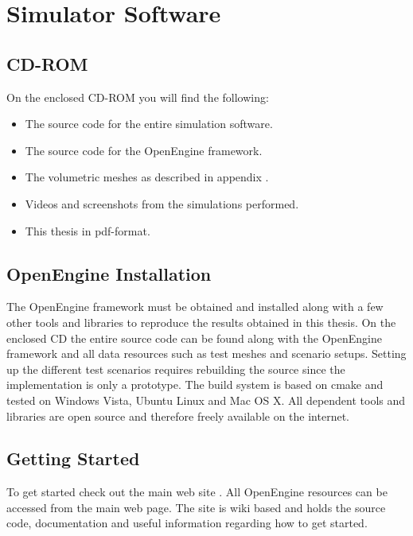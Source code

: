 
\chapter{Simulator Software}
\section{CD-ROM}
On the enclosed CD-ROM you will find the following:

\begin{itemize}
\item The source code for the entire simulation software.

\item The source code for the OpenEngine framework. 

\item The volumetric meshes as described in appendix
  .

\item Videos and screenshots from the simulations performed.

\item This thesis in pdf-format.
\end{itemize}

\section{OpenEngine Installation}
\label{sec:openengine_installation}
The OpenEngine framework
must be obtained and installed along with a few other tools and
libraries to reproduce the results obtained in this thesis. 
On the enclosed CD the entire
source code can be found along with the OpenEngine framework and all data
resources such as test meshes and scenario setups.
%
Setting up the different test scenarios requires rebuilding the source
since the implementation is only a prototype. The build system
is based on cmake and tested on Windows Vista, Ubuntu Linux and Mac OS
X. All dependent tools and libraries are open source and therefore
freely available on the internet.

\section{Getting Started}
To get started check out the main web site
. All OpenEngine resources
can be accessed from the main web page. The site is wiki based and
holds the source code, documentation and useful information regarding
how to get started.

